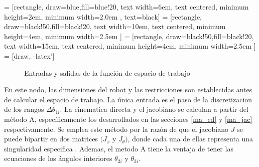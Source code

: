     
         = [rectangle, draw=blue,fill=blue!20, text width=6em, text centered, minimum height=2em, minimum width=2.0em , text=black]
         = [rectangle, draw=black!50,fill=black!20, text width=10em, text centered, minimum height=4em, minimum width=2.5em ]
         = [rectangle, draw=black!50,fill=black!20, text width=15em, text centered, minimum height=4em, minimum width=2.5em ]
         = [draw, -latex']
         \begin{center}
         \begin{figure}[htb]
                \caption{Entradas y salidas de la función de espacio de trabajo}
                \label{f:Cap6_ws_1}
         \end{figure}
         \end{center}
         
        \vspace{-1cm}         
    
    En este nodo, las dimensiones del robot y las restricciones son establecidas antes de calcular el espacio de trabajo. La única entrada es el paso de la discretizacion de los rangos \(  \Delta  \theta _{1i} \). La cinematica directa y el jacobiano se calculan a partir del método A, específicamente los desarrollados en las secciones \ref{ma_cd} y \ref{ma_jac} respectivamente. Se emplea este método por la razón de que el jacobiano $J$ se puede bipartir en dos matrices $(J_{x}$  y  $J_{ \theta })$, donde cada una de ellas representa una singularidad especifica . Ademas, el metodo A tiene la ventaja de tener las ecuaciones de los ángulos interiores $\theta_{2i}$ y $\theta_{3i}$.
    
